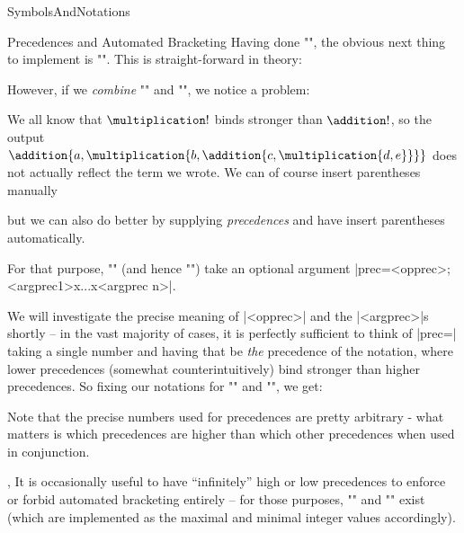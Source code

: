 \begin{smodule}[ns=https://github.com/slatex/sTeX/doc]{SymbolsAndNotations}
\begin{sfragment}{Precedences and Automated Bracketing}
  Having done \stexcode"\addition", the obvious next thing to implement is
  \stexcode"\multiplication".  This is straight-forward in theory:


However, if we \emph{combine} \stexcode"\addition" and \stexcode"\multiplication", we
notice a problem:


We all know that $\multiplication!$ binds stronger than $\addition!$, so the output
$\addition{a,\multiplication{b,\addition{c,\multiplication{d,e}}}}$ does not actually
reflect the term we wrote. We can of course insert parentheses manually

but we can also do better by supplying \emph{precedences} and
have \sTeX insert parentheses automatically.

For that purpose, \stexcode"\notation" (and hence \stexcode"\symdef") take an optional
argument |prec=<opprec>;<argprec1>x...x<argprec n>|.

We will investigate the precise meaning of |<opprec>| and the |<argprec>|s shortly -- in
the vast majority of cases, it is perfectly sufficient to think of |prec=| taking a single
number and having that be \emph{the} precedence of the notation, where lower precedences
(somewhat counterintuitively) bind stronger than higher precedences.  So fixing our
notations for \stexcode"\addition" and \stexcode"\multiplication", we get:


Note that the precise numbers used for precedences are pretty arbitrary - what matters is
which precedences are higher than which other precedences when used in conjunction.
\begin{variable}{\infprec,\neginfprec}
  It is occasionally useful to have ``infinitely'' high or low precedences to enforce or
  forbid automated bracketing entirely -- for those purposes, \stexcode"\infprec" and
  \stexcode"\neginfprec" exist (which are implemented as the maximal and minimal integer
  values accordingly).
\end{variable}


\end{sfragment}
\end{smodule}
